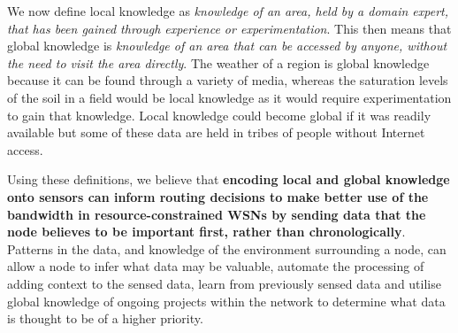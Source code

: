 We now define local knowledge as \textit{knowledge of an area, held by a domain expert, that has been gained through experience or experimentation}. This then means that global knowledge is \textit{knowledge of an area that can be accessed by anyone, without the need to visit the area directly}. The weather of a region is global knowledge because it can be found through a variety of media, whereas the saturation levels of the soil in a field would be local knowledge as it would require experimentation to gain that knowledge. Local knowledge could become global if it was readily available but some of these data are held in tribes of people without Internet access.

Using these definitions, we believe that \textbf{encoding local and global knowledge onto sensors can inform routing decisions to make better use of the bandwidth in resource-constrained WSNs by sending data that the node believes to be important first, rather than chronologically}. Patterns in the data, and knowledge of the environment surrounding a node, can allow a node to infer what data may be valuable, automate the processing of adding context to the sensed data, learn from previously sensed data and utilise global knowledge of ongoing projects within the network to determine what data is thought to be of a higher priority.


